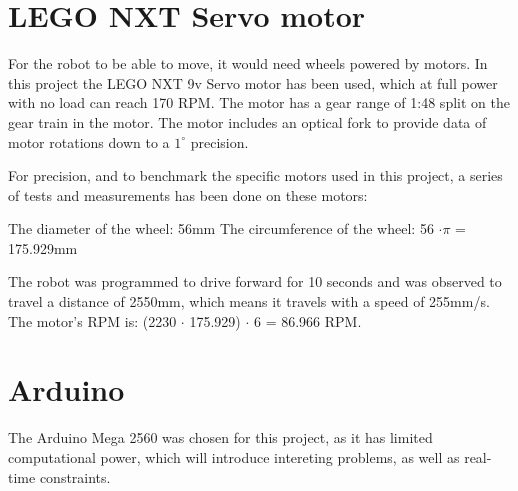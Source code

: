 \section{LEGO NXT Servo motor}
\label{sec:LEGO NXT Servo motor}
For the robot to be able to move, it would need wheels powered by motors. In this project the LEGO NXT 9v Servo motor has been used, which at full power with no load can reach 170 RPM. The motor has a gear range of 1:48 split on the gear train in the motor. \citep{Servo} The motor includes an optical fork to provide data of motor rotations down to a \(1^{\circ}\) precision.

For precision, and to benchmark the specific motors used in this project, a series of tests and measurements has been done on these motors:

The diameter of the wheel: 56mm \newline
The circumference of the wheel: 56 \begin{math}\cdot \pi \end{math} = 175.929mm

The robot was programmed to drive forward for 10 seconds and was observed to travel a distance of 2550mm, which means it travels with a speed of 255mm/s. \newline
The motor’s RPM is: (2230 \begin{math} \cdot \end{math} 175.929) \begin{math} \cdot \end{math} 6 = 86.966 RPM.


\section{Arduino}
\label{sec:Arduino}
The Arduino Mega 2560 was chosen for this project, as it has limited computational power, which will introduce intereting problems, as well as real-time constraints. \citep{a}

